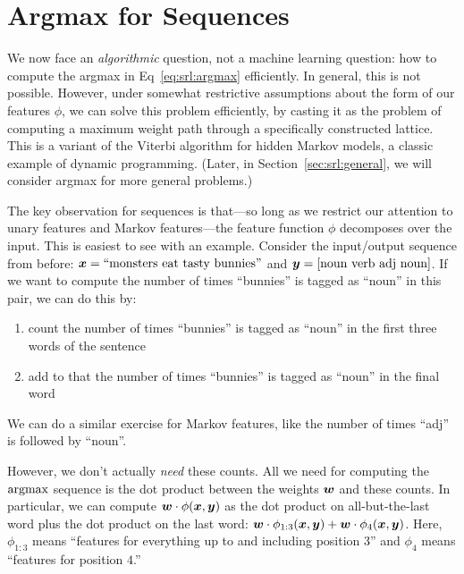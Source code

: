 \section{Argmax for Sequences}

We now face an \emph{algorithmic} question, not a machine learning question: how to compute the argmax in Eq~\ref{eq:srl:argmax} efficiently.
In general, this is not possible.
However, under somewhat restrictive assumptions about the form of our features $\phi$, we can solve this problem efficiently, by casting it as the problem of computing a maximum weight path through a specifically constructed lattice.
This is a variant of the Viterbi algorithm for hidden Markov models, a classic example of dynamic programming. (Later, in Section~\ref{sec:srl:general}, we will consider argmax for more general problems.)

The key observation for sequences is that---so long as we restrict our attention to unary features and Markov features---the feature function $\phi$ decomposes over the input.
This is easiest to see with an example.
Consider the input/output sequence from before: ${\boldsymbol{x}} = \text{``monsters eat tasty bunnies''}$ and ${\boldsymbol{y}} = \text{[noun verb adj noun]}$.
If we want to compute the number of times ``bunnies'' is tagged as ``noun'' in this pair, we can do this by:
\begin{enumerate}
\item count the number of times ``bunnies'' is tagged as ``noun'' in the first three words of the sentence
\item add to that the number of times ``bunnies'' is tagged as ``noun'' in the final word
\end{enumerate}
We can do a similar exercise for Markov features, like the number of times ``adj'' is followed by ``noun''.

However, we don't actually \emph{need} these counts.
All we need for computing the $\argmax$ sequence is the dot product between the weights ${\boldsymbol{w}}$ and these counts.
In particular, we can compute ${\boldsymbol{w}} \cdot \phi({\boldsymbol{x}},{\boldsymbol{y}})$ as the dot product on all-but-the-last word plus the dot product on the last word: ${\boldsymbol{w}} \cdot \phi_{1:3}({\boldsymbol{x}}, {\boldsymbol{y}}) + {\boldsymbol{w}} \cdot \phi_4({\boldsymbol{x}}, {\boldsymbol{y}})$.
Here, $\phi_{1:3}$ means ``features for everything up to and including position $3$'' and $\phi_{4}$ means ``features for position $4$.''

